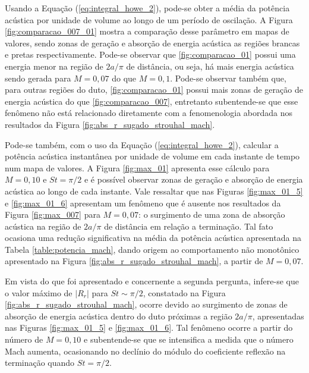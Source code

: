 \newpage
Usando a Equação (\ref{eq:integral_howe_2}), pode-se obter a média da potência acústica por unidade de volume ao longo de um período de oscilação. A Figura \ref{fig:comparacao_007_01} mostra a comparação desse parâmetro em mapas de valores, sendo zonas de geração e absorção de energia acústica as regiões brancas e pretas respectivamente. Pode-se observar que \ref{fig:comparacao_01} possui uma energia menor na região de $2a/\pi$ de distância, ou seja, há mais energia acústica sendo gerada para $M = 0,07$ do que $M = 0,1$. Pode-se observar também que, para outras regiões do duto, \ref{fig:comparacao_01} possui mais zonas de geração de energia acústica do que \ref{fig:comparacao_007}, entretanto subentende-se que esse fenômeno não está relacionado diretamente com a fenomenologia abordada nos resultados da Figura \ref{fig:abs_r_sugado_strouhal_mach}.   

Pode-se também, com o uso da Equação (\ref{eq:integral_howe_2}), calcular a potência acústica instantânea por unidade de volume em cada instante de tempo num mapa de valores. A Figura \ref{fig:max_01} apresenta esse cálculo para $M = 0,10$ e $St = \pi/2$ e é possível observar zonas de geração e absorção de energia acústica ao longo de cada instante. Vale ressaltar que nas Figuras \ref{fig:max_01_5} e \ref{fig:max_01_6} apresentam um fenômeno que é ausente nos resultados da Figura \ref{fig:max_007} para $M = 0,07$: o surgimento de uma zona de absorção acústica na região de $2a/\pi$ de distância em relação a terminação. Tal fato ocasiona uma redução significativa na média da potência acústica apresentada na Tabela \ref{table:potencia_mach}, dando origem ao comportamento não monotônico apresentado na Figura \ref{fig:abs_r_sugado_strouhal_mach}, a partir de $M = 0,07$.

Em vista do que foi apresentado e concernente a segunda pergunta, infere-se que o valor máximo de $|R_{r}|$ para $St \sim \pi/2$, constatado na Figura \ref{fig:abs_r_sugado_strouhal_mach}, ocorre devido ao surgimento de zonas de absorção de energia acústica dentro do duto próximas a região $2a/\pi$, apresentadas nas Figuras \ref{fig:max_01_5} e \ref{fig:max_01_6}. Tal fenômeno ocorre a partir do número de $M = 0,10$ e subentende-se que se intensifica a medida que o número Mach aumenta, ocasionando no declínio do módulo do coeficiente reflexão na terminação quando $St = \pi/2$.

